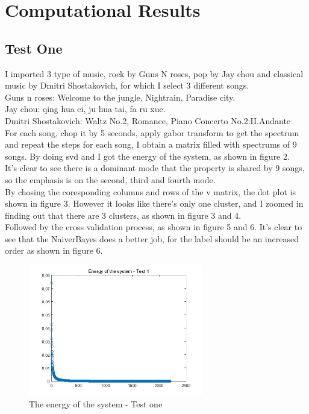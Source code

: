 \documentclass[12pt,letterpaper]{article}
\begin{document}
\section{Computational Results}
\subsection{Test One}
I imported 3 type of music, rock by Guns N roses, pop by Jay chou and classical music by Dmitri Shostakovich, for which I select 3 different songs. \\
Guns n roses: Welcome to the jungle, Nightrain, Paradise city.\\
Jay chou: qing hua ci, ju hua tai, fa ru xue.\\
Dmitri Shostakovich: Waltz No.2, Romance, Piano Concerto No.2:II.Andante\\
For each song, chop it by 5 seconds, apply gabor transform to get the spectrum and repeat the steps for each song, I obtain a matrix filled with spectrums of 9 songs. By doing svd and I got the energy of the system, as shown in figure 2.\\
It's clear to see there is a dominant mode that the property is shared by 9 songs, so the emphasis is on the second, third and fourth mode.\\
By chosing the coresponding columns and rows of the v matrix, the dot plot is shown in figure 3. However it looks like there's only one cluster, and I zoomed in finding out that there are 3 clusters, as shown in figure 3 and 4.\\
Followed by the cross validation process, as shown in figure 5 and 6.
It's clear to see that the NaiverBayes does a better job, for the label should be an increased order as shown in figure 6. 
\begin{figure}[h]
	\centering
	\includegraphics[width=3.0in]{p1}
	\caption{The energy of the system - Test one}
	
\end{figure}
\end{document}
